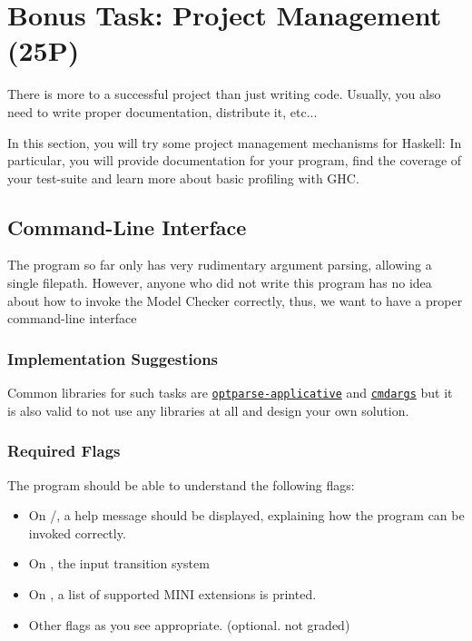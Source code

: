 \documentclass{article}
\begin{document}
\section{Bonus Task: Project Management (25P)}

There is more to a successful project than just writing code. 
Usually, you also need to write proper documentation, distribute it, etc...

In this section, you will try some project management mechanisms for Haskell: 
In particular, you will provide documentation for your program, 
find the coverage of your test-suite and learn more about basic profiling with GHC.

\subsection{Command-Line Interface}

The program so far only has very rudimentary argument parsing, allowing a single filepath.
However, anyone who did not write this program has no idea about how to invoke the Model Checker correctly,
thus, we want to have a proper command-line interface

\subsubsection*{Implementation Suggestions}

Common libraries for such tasks are \href{https://hackage.haskell.org/package/optparse-applicative}{\texttt{optparse-applicative}} 
and \href{https://hackage.haskell.org/package/cmdargs}{\texttt{cmdargs}} but it is also valid to not use any libraries at all 
and design your own solution.

\subsubsection*{Required Flags}

The program should be able to understand the following flags:

\begin{itemize}
\item On /, a help message should be displayed, explaining how the program can be invoked correctly.
\item On , the input transition system
\item On , a list of supported MINI extensions is printed.
\item Other flags as you see appropriate. (optional. not graded)
\end{itemize}
\end{document}
